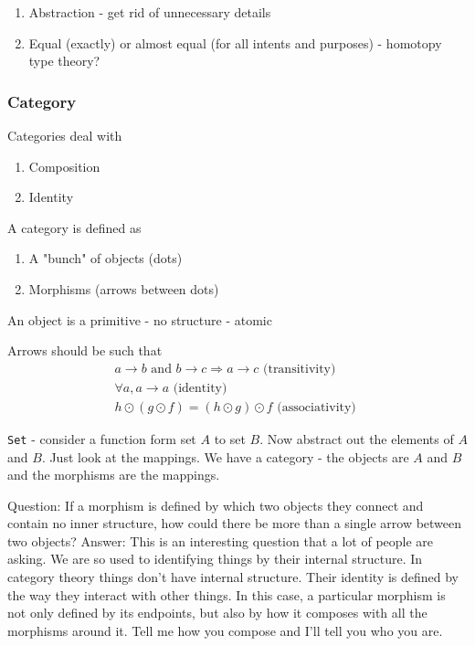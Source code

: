 \documentclass[titlepage, 12pt]{article}
\begin{document}
\begin{enumerate}
	\item Abstraction - get rid of unnecessary details
	\item Equal (exactly) or almost equal (for all intents and purposes) -
		homotopy type theory?
\end{enumerate}

\subsubsection{Category}
Categories deal with
\begin{enumerate}

	\item Composition

	\item Identity

\end{enumerate}

A category is defined as
\begin{enumerate}
	\item A "bunch" of objects (dots)
	\item Morphisms (arrows between dots)
\end{enumerate}

An object is a primitive - no structure - atomic

Arrows should be such that
\begin{gather*}
	a\rightarrow b \textrm{ and } b\rightarrow c \Rightarrow a\rightarrow
	c\textrm{ (transitivity) }\\
	\forall a, a\rightarrow a\textrm{ (identity) }\\
	h\odot(g\odot f) = (h\odot g)\odot f\textrm{ (associativity) }
\end{gather*}

\verb#Set# - consider a function form set $A$ to set $B$. Now abstract out the
elements of $A$ and $B$. Just look at the mappings. We have a category - the
objects are $A$ and $B$ and the morphisms are the mappings.

Question: If a morphism is defined by which two objects they connect and contain
no inner structure, how could there be more than a single arrow between two
objects? 
Answer:  This is an interesting question that a lot of people are asking. We are
so used to identifying things by their internal structure. In category theory
things don't have internal structure. Their identity is defined by the way they
interact with other things. In this case, a particular morphism is not only
defined by its endpoints, but also by how it composes with all the morphisms
around it. Tell me how you compose and I'll tell you who you are. 
\end{document}

